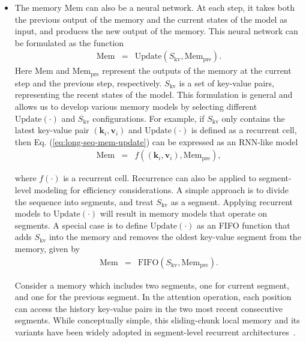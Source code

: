 \begin{itemize}
\item \vspace{0.3em} The memory $\mathrm{Mem}$ can also be a neural network. At each step, it takes both the previous output of the memory and the current states of the model as input, and produces the new output of the memory. This neural network can be formulated as the function
    \begin{eqnarray}
    \mathrm{Mem} & = & \mathrm{Update}(S_{\mathrm{kv}}, \mathrm{Mem}_{\mathrm{pre}}) \label{eq:long-seq-mem-update}.
    \end{eqnarray}
    \noindent Here $\mathrm{Mem}$ and $\mathrm{Mem}_{\mathrm{pre}}$ represent the outputs of the memory at the current step and the previous step, respectively. $S_{\mathrm{kv}}$ is a set of key-value pairs, representing the recent states of the model. This formulation is general and allows us to develop various memory models by selecting different $\mathrm{Update}(\cdot)$ and $S_{\mathrm{kv}}$ configurations. For example, if $S_{\mathrm{kv}}$ only contains the latest key-value pair $(\mathbf{k}_i,\mathbf{v}_i)$ and $\mathrm{Update}(\cdot)$ is defined as a recurrent cell, then Eq. (\ref{eq:long-seq-mem-update}) can be expressed as an RNN-like model
    \begin{eqnarray}
    \mathrm{Mem} & = & f((\mathbf{k}_i,\mathbf{v}_i), \mathrm{Mem}_{\mathrm{pre}}),
    \end{eqnarray}

    \noindent where $f(\cdot)$ is a recurrent cell. Recurrence can also be applied to segment-level modeling for efficiency considerations. A simple approach is to divide the sequence into segments, and treat $S_{\mathrm{kv}}$ as a segment. Applying recurrent models to $\mathrm{Update}(\cdot)$ will result in memory models that operate on segments. A special case is to define $\mathrm{Update}(\cdot)$ as an FIFO function that adds $S_{\mathrm{kv}}$ into the memory and removes the oldest key-value segment from the memory, given by
    \begin{eqnarray}
    \mathrm{Mem} & = & \mathrm{FIFO}(S_{\mathrm{kv}}, \mathrm{Mem}_{\mathrm{pre}}).
    \end{eqnarray}

    \noindent Consider a memory which includes two segments, one for current segment, and one for the previous segment. In the attention operation, each position can access the history key-value pairs in the two most recent consecutive segments. While conceptually simple, this sliding-chunk local memory and its variants have been widely adopted in segment-level recurrent architectures~\cite{dai-etal:2019transformer,hutchins-etal:2022block,bulatov-etal:2022recurrent}.


\end{itemize}
